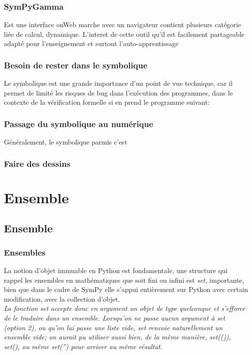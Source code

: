 \documentclass[11pt,fleqn]{book} %
\begin{document}
\subsection{SymPyGamma}
Est une interface onWeb marche avec un navigateur contient plusieurs catégorie liée de calcul, dynamique. L'interet de cette outil qu'il est facilement partageable adapté pour l’enseignement et surtout l'auto-apprentissage 
\subsection{Besoin de rester dans le symbolique}
Le symbolique est une grande importance d'un point de vue technique, car il permet
de limité les risques de bug dans l'exécution des programmes, dans le contexte de 
la vérification formelle si en prend le programme suivant:

\subsection{Passage du symbolique au numérique}
Généralement, le symbolique parmis c'est  
\subsection{Faire des dessins}



\chapter{Ensemble}

\section{Ensemble}

\subsection{Ensembles}
La notion d'objet immuable en Python est fondamentale,  une structure qui rappel les ensembles en mathématiques que soit fini ou infini est \textit{set}, importante, bien que
dans le cadre de SymPy elle s'appui entièrement sur Python avec certain modification, avec la collection d'objet.
\\

\textit{La fonction set accepte donc en argument un objet de type quelconque et s'efforce de le traduire dans un ensemble. Lorsqu'on ne passe aucun argument à set (option 2), ou qu'on lui passe une liste vide, set renvoie naturellement un ensemble vide; on aurait pu utiliser aussi bien, de la même manière, set(()), set({}), ou même set('') pour arriver au même résultat.}
\end{document}

